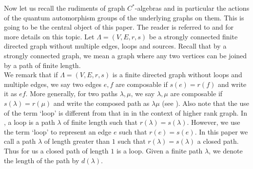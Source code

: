 \documentclass{amsart}
\theoremstyle{plain}
\theoremstyle{definition}
\theoremstyle{remark}
\numberwithin{equation}{section}
\begin{document}
Now let us recall the rudiments of graph $C^{\ast}$-algebras and in particular the actions of the quantum automorphism groups of the underlying graphs on them. This is going to be the central object of this paper. The reader is referred to \cite{raeburn} and \cites{weber, joardar1} for more details on this topic. Let $\Lambda=(V,E,r,s)$ be a strongly connected finite directed graph without multiple edges, loops and sources. Recall that by a strongly connected graph, we mean a graph where any two vertices can be joined by a path of finite length. \\

    \indent We remark that if $\Lambda=(V,E,r,s)$ is a finite directed graph without loops and multiple edges, we say two edges $e,f$ are composable if $s(e)=r(f)$ and write it as $ef$. More generally, for two paths $\lambda,\mu$, we say $\lambda,\mu$ are composable if $s(\lambda)=r(\mu)$ and write the composed path as $\lambda\mu$ (see \cite{farsi}). Also note that the use of the term `loop' is different from that in \cite{farsi} in the context of higher rank graph. In \cite{farsi}, a loop is a path $\lambda$ of finite length such that $r(\lambda)=s(\lambda)$. However, we use the term `loop' to represent an edge $e$ such that $r(e)=s(e)$. In this paper we call a path $\lambda$ of length greater than $1$ such that $r(\lambda)=s(\lambda)$ a closed path. Thus for us a closed path of length $1$ is a loop. Given a finite path $\lambda$, we denote the length of the path by $d(\lambda)$. 
\end{document}
